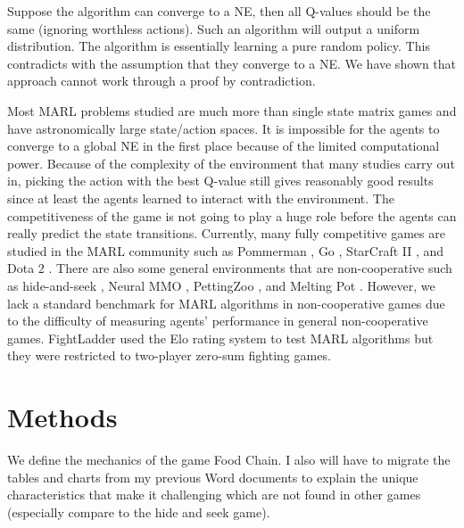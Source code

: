 \documentclass[a4paper]{article}
\begin{document}
\begin{multicols}{2}
Suppose the algorithm can converge to a NE, then all Q-values should be the same (ignoring worthless actions). Such an algorithm will output a uniform distribution. The algorithm is essentially learning a pure random policy. This contradicts with the assumption that they converge to a NE. We have shown that approach cannot work through a proof by contradiction.

Most MARL problems studied are much more than single state matrix games and have astronomically large state/action spaces. It is impossible for the agents to converge to a global NE in the first place because of the limited computational power. Because of the complexity of the environment that many studies carry out in, picking the action with the best Q-value still gives reasonably good results since at least the agents learned to interact with the environment. The competitiveness of the game is not going to play a huge role before the agents can really predict the state transitions. Currently, many fully competitive games are studied in the MARL community such as Pommerman \cite{resnick2018pommerman}, Go \cite{silver2017mastering}, StarCraft II \cite{vinyals2019grandmaster}, and Dota 2 \cite{berner2019dota}. There are also some general environments that are non-cooperative such as hide-and-seek \cite{baker2019emergent}, Neural MMO \cite{suarez2021neural}, PettingZoo \cite{terry2021pettingzoo}, and Melting Pot \cite{leibo2021scalable}. However, we lack a standard benchmark for MARL algorithms in non-cooperative games due to the difficulty of measuring agents' performance in general non-cooperative games.
FightLadder \cite{li2024fightladder} used the Elo rating system to test MARL algorithms but they were restricted to two-player zero-sum fighting games.

\section{Methods}
We define the mechanics of the game Food Chain. I also will have to migrate the tables and charts from my previous Word documents to explain the unique characteristics that make it challenging which are not found in other games (especially compare to the hide and seek game).


\end{multicols}
\end{document}

